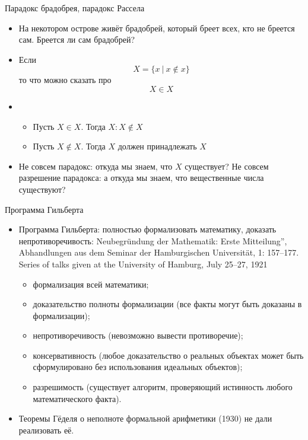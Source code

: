\documentclass[aspectratio=169]{beamer}
\begin{document}
\begin{frame}{Парадокс брадобрея, парадокс Рассела}

\begin{itemize}
\item На некотором острове живёт брадобрей, который бреет всех, кто не бреется
сам. Бреется ли сам брадобрей? \pause
\item Если
$$X = \{ x \ |\ x \notin x\}$$ \pause
то что можно сказать про
$$X \in X$$ \pause

\item \begin{itemize}
\item Пусть $X \in X$. Тогда $X : X \notin X$\pause
\item Пусть $X \notin X$. Тогда $X$ должен принадлежать $X$\pause
\end{itemize}

\item Не совсем парадокс: откуда мы знаем, что $X$ существует? \pause
Не совсем разрешение парадокса: а откуда мы знаем, что вещественные числа существуют?
\end{itemize}
\end{frame}

\begin{frame}{Программа Гильберта}
\begin{itemize}
\item Программа Гильберта: полностью формализовать математику, доказать непротиворечивость:
Neubegründung der Mathematik: Erste Mitteilung”, Abhandlungen aus dem Seminar der Hamburgischen Universität, 1: 157–177. Series of talks given at the University of Hamburg, July 25–27, 1921

\begin{itemize}
\item формализация всей математики;
\item доказательство полноты формализации (все факты могут быть доказаны в формализации);
\item непротиворечивость (невозможно вывести противоречие);
\item консервативность (любое доказательство о реальных объектах может быть сформулировано без использования идеальных объектов);
\item разрешимость (существует алгоритм, проверяющий истинность любого математического факта).
\end{itemize}

\item Теоремы Гёделя о неполноте формальной арифметики (1930) не дали реализовать её.
\end{itemize}
\end{frame}
\end{document}
